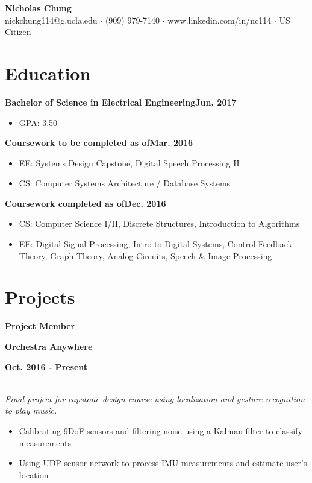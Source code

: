 \documentclass[12pt]{article}
\newcommand\textbox[1]{\parbox{.333\textwidth}{#1}}
\newcommand{\textlcr}[3]{\textbox{\textbf{#1}\hfill}\textbox{\hfil \textbf{#2}\hfil}\textbox{\hfill \textbf{#3}}}
\begin{document}
\begin{center}
	\textbf{\LARGE Nicholas Chung} \\ \vspace{.5ex}
	nickchung114@g.ucla.edu $\cdot$ (909) 979-7140 $\cdot$ www.linkedin.com/in/nc114 $\cdot$ US Citizen
\end{center}

\vspace{-8pt}
\smallskip
\section*{Education}
\vspace*{-1em}\makebox[\linewidth]{\rule{\textwidth}{0.4pt}}

\textbf{Bachelor of Science in Electrical Engineering}\hfill\textbf{Jun. 2017}
\begin{itemize}
\item GPA: 3.50
\end{itemize}

\textbf{Coursework to be completed as of}\hfill\textbf{Mar. 2016}
\begin{itemize}
\item EE: Systems Design Capstone, Digital Speech Processing II
\item CS: Computer Systems Architecture / Database Systems
\end{itemize}

\textbf{Coursework completed as of}\hfill\textbf{Dec. 2016}
\begin{itemize}
\item CS: Computer Science I/II, Discrete Structures, Introduction to Algorithms
\item EE: Digital Signal Processing, Intro to Digital Systems, Control Feedback Theory, Graph Theory, Analog Circuits,  Speech \& Image Processing
\end{itemize}

\section*{Projects}
\vspace*{-1em}\makebox[\linewidth]{\rule{\textwidth}{0.4pt}}

\textlcr{Project Member}{Orchestra Anywhere}{Oct. 2016 - Present}
\\ \textit{Final project for capstone design course using localization and gesture recognition to play music.}
\begin{itemize}
\item Calibrating 9DoF sensors and filtering noise using a Kalman filter to classify measurements
\item Using UDP sensor network to process IMU measurements and estimate user's location
\end{itemize}
\end{document}
